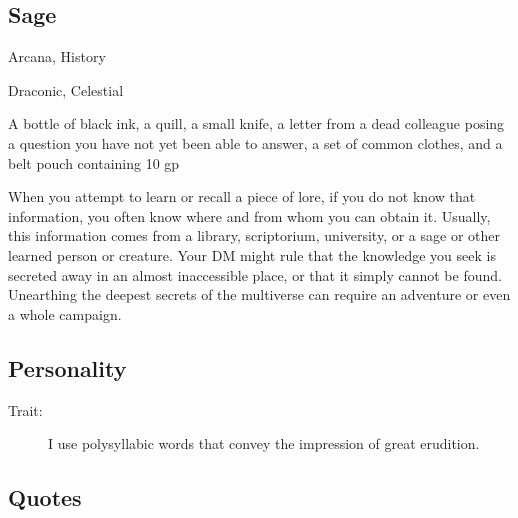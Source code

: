 \documentclass[letterpaper,10pt,twoside,twocolumn,openany]{book}
\begin{document}
\subsection{Sage}
\begin{description}[font=\normalfont\textbf,noitemsep,topsep=1ex,leftmargin=1em]
	\item[Skill Proficiencies:] Arcana, History
	\item[Languages:] Draconic, Celestial
	\item[Equipment:] A bottle of black ink, a quill, a small knife, a letter from a dead colleague posing a question you have not yet been able to answer, a set of common clothes, and a belt pouch containing 10 gp
	\item[Feature - Researcher:] When you attempt to learn or recall a piece of lore, if you do not know that information, you often know where and from whom you can obtain it. Usually, this information comes from a library, scriptorium, university, or a sage or other learned person or creature. Your DM might rule that the knowledge you seek is secreted away in an almost inaccessible place, or that it simply cannot be found. Unearthing the deepest secrets of the multiverse can require an adventure or even a whole campaign. 
\end{description}

\subsection{Personality}

\begin{description}
	\item[Trait:] I use polysyllabic words that convey the impression of great erudition.
\end{description}

\subsection{Quotes}
\end{document}
